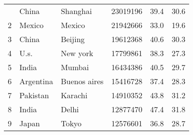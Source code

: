 \begin{center}
\begin{longtable}{clllcc}
        \hline
        \endlastfoot
        1                                        & China                                & Shanghai                          & 23019196                                & 39.4                                  & 30.6                                  \\
        2                                        & Mexico                               & Mexico                            & 21942666                                & 33.0                                  & 19.6                                  \\
        3                                        & China                                & Beijing                           & 19612368                                & 40.6                                  & 30.3                                  \\
        4                                        & U.s.                                 & New york                          & 17799861                                & 38.3                                  & 27.3                                  \\
        5                                        & India                                & Mumbai                            & 16434386                                & 40.5                                  & 29.7                                  \\
        6                                        & Argentina                            & Buenos aires                      & 15416728                                & 37.4                                  & 28.3                                  \\
        7                                        & Pakistan                             & Karachi                           & 14910352                                & 43.8                                  & 31.2                                  \\
        8                                        & India                                & Delhi                             & 12877470                                & 47.4                                  & 31.8                                  \\
        9                                        & Japan                                & Tokyo                             & 12576601                                & 36.8                                  & 28.7                                  \\

\end{longtable}
\end{center}
